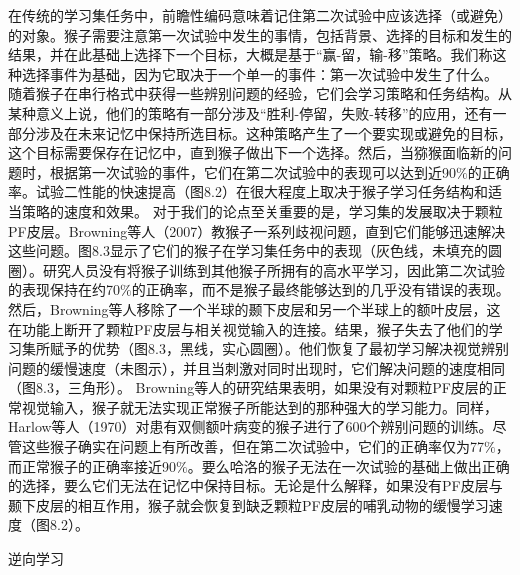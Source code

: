 在传统的学习集任务中，前瞻性编码意味着记住第二次试验中应该选择（或避免）的对象。猴子需要注意第一次试验中发生的事情，包括背景、选择的目标和发生的结果，并在此基础上选择下一个目标，大概是基于“赢-留，输-移”策略。我们称这种选择事件为基础，因为它取决于一个单一的事件：第一次试验中发生了什么。
随着猴子在串行格式中获得一些辨别问题的经验，它们会学习策略和任务结构。从某种意义上说，他们的策略有一部分涉及“胜利-停留，失败-转移”的应用，还有一部分涉及在未来记忆中保持所选目标。这种策略产生了一个要实现或避免的目标，这个目标需要保存在记忆中，直到猴子做出下一个选择。然后，当猕猴面临新的问题时，根据第一次试验的事件，它们在第二次试验中的表现可以达到近90$\%$的正确率。试验二性能的快速提高（图8.2）在很大程度上取决于猴子学习任务结构和适当策略的速度和效果。
对于我们的论点至关重要的是，学习集的发展取决于颗粒PF皮层。Browning等人（2007）教猴子一系列歧视问题，直到它们能够迅速解决这些问题。图8.3显示了它们的猴子在学习集任务中的表现（灰色线，未填充的圆圈）。研究人员没有将猴子训练到其他猴子所拥有的高水平学习，因此第二次试验的表现保持在约70$\%$的正确率，而不是猴子最终能够达到的几乎没有错误的表现。
然后，Browning等人移除了一个半球的颞下皮层和另一个半球上的额叶皮层，这在功能上断开了颗粒PF皮层与相关视觉输入的连接。结果，猴子失去了他们的学习集所赋予的优势（图8.3，黑线，实心圆圈）。他们恢复了最初学习解决视觉辨别问题的缓慢速度（未图示），并且当刺激对同时出现时，它们解决问题的速度相同（图8.3，三角形）。
Browning等人的研究结果表明，如果没有对颗粒PF皮层的正常视觉输入，猴子就无法实现正常猴子所能达到的那种强大的学习能力。同样，Harlow等人（1970）对患有双侧额叶病变的猴子进行了600个辨别问题的训练。尽管这些猴子确实在问题上有所改善，但在第二次试验中，它们的正确率仅为77$\%$，而正常猴子的正确率接近90$\%$。要么哈洛的猴子无法在一次试验的基础上做出正确的选择，要么它们无法在记忆中保持目标。无论是什么解释，如果没有PF皮层与颞下皮层的相互作用，猴子就会恢复到缺乏颗粒PF皮层的哺乳动物的缓慢学习速度（图8.2）。

逆向学习

